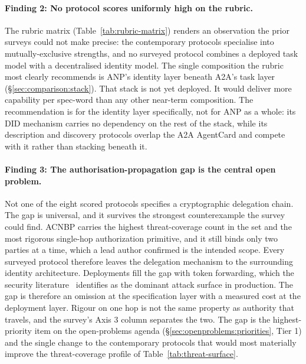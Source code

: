 \paragraph{Finding 2: No protocol scores uniformly
high on the rubric.}
The rubric matrix
(Table~\ref{tab:rubric-matrix}) renders an
observation the prior surveys could not make
precise: the contemporary protocols specialise
into mutually-exclusive strengths, and no surveyed
protocol combines a deployed task model with a
decentralised identity model. The single
composition the rubric most clearly recommends is
ANP's identity layer beneath A2A's task layer
(\S\ref{sec:comparison:stack}). That stack is not yet
deployed. It would deliver more capability
per spec-word than any other near-term composition.
The recommendation is for the identity layer specifically,
not for ANP as a whole: its DID mechanism carries no
dependency on the rest of the stack, while its description
and discovery protocols overlap the A2A AgentCard and
compete with it rather than stacking beneath it.

\paragraph{Finding 3: The authorisation-propagation
gap is the central open problem.}
Not one of the eight scored protocols specifies a
cryptographic delegation chain. The gap is universal, and
it survives the strongest counterexample the survey could
find. ACNBP carries the highest threat-coverage count in
the set and the most rigorous single-hop authorization
primitive, and it still binds only two parties at a time,
which a lead author confirmed is the intended scope. Every
surveyed protocol therefore leaves the delegation
mechanism to the surrounding identity architecture.
Deployments fill the gap with token
forwarding, which the security
literature~\cite{authz_propagation, agentic_jwt}
identifies as the dominant attack surface in
production. The gap is therefore an omission at the
specification layer with a measured cost at the
deployment layer. Rigour on one hop is not the same
property as authority that travels, and the survey's
Axis 3 column separates the two. The gap is the highest-priority item
on the open-problems agenda
(\S\ref{sec:openproblems:priorities}, Tier 1) and
the single change to the contemporary protocols
that would most materially improve the threat-coverage
profile of
Table~\ref{tab:threat-surface}.

